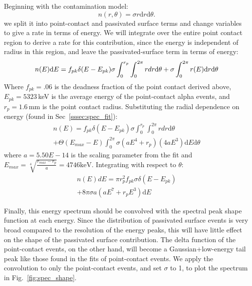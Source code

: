 Beginning with the contamination model:
$$n(r, \theta) = \sigma r \mathrm{d}r \mathrm{d}\theta. $$
we split it into point-contact and passivated surface terms and change variables to give a rate in terms of energy. We will integrate over the entire point contact region to derive a rate for this contribution, since the energy is independent of radius in this region, and leave the passivated-surface term in terms of energy:
$$n(E)\mathrm{d}E =  f_{pk}\delta(E-E_{pk})\sigma \int_{0}^{r_p} \int_{0}^{2\pi}r{d}r \mathrm{d}\theta \\
+ \sigma \int_{0}^{2\pi}r(E)\mathrm{d}r \mathrm{d}\theta 
$$
Where $f_{pk} = .06$ is the deadness fraction of the point contact derived above, $E_{pk}= 5323$\,keV is the average energy of the point-contact alpha events, and $r_p = 1.6$\,mm is the point contact radius. Substituting the radial dependence on energy (found in Sec~\ref{sssec:spec_fit}):
\begin{equation}
\begin{split}
n(E) = f_{pk}\delta(E-E_{pk})\sigma \int_{0}^{r_p} \int_{0}^{2\pi}r{d}r \mathrm{d}\theta \\
+  \Theta(E_{max}-E)\int_{0}^{2\pi}\sigma(aE^4 + r_p)(4aE^3)\mathrm{d}E \mathrm{d}\theta
\end{split}
\end{equation}
\vspace{1cm}
where $a = 5.50E-14$ is the scaling parameter from the fit and $E_{max} = \sqrt[4]{\frac{r_{max}-r_p}{a}} = 4746\mathrm{keV}$. 
Integrating with respect to $\theta$:
\begin{equation}
\begin{split}
n(E)dE = \pi r_p^2 f_{pk}\sigma\delta(E-E_{pk}) \\
+ 8\pi \sigma a (aE^7 + r_pE^3) \mathrm{d}E
\end{split}
\end{equation}

Finally, this energy spectrum should be convolved with the spectral peak shape function at each energy. Since the distribution of passivated surface events is very broad compared to the resolution of the energy peaks, this will have little effect on the shape of the passivated surface contribution. The delta function of the point-contact events, on the other hand, will become a Gaussian+low-energy tail peak like those found in the fits of point-contact events. We apply the convolution to only the point-contact events, and set $\sigma$ to 1, to plot the spectrum in Fig.~\ref{fig:spec_shape}.
 
